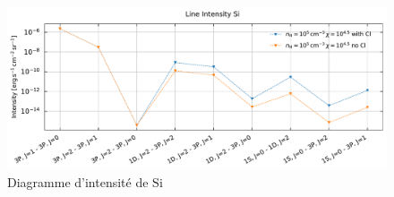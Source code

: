 \begin{appendices}
\begin{figure}[!h]
    \centering \includegraphics[trim = {0 0 0 1cm},clip,width=1\textwidth]{figure/Cl/gridModelEmiss/I_comp_Si.pdf}
        \caption{Diagramme d'intensité de $\mathrm{Si}$}
        \label{fig:cl:emiss:Si}
\end{figure}


\end{appendices}
